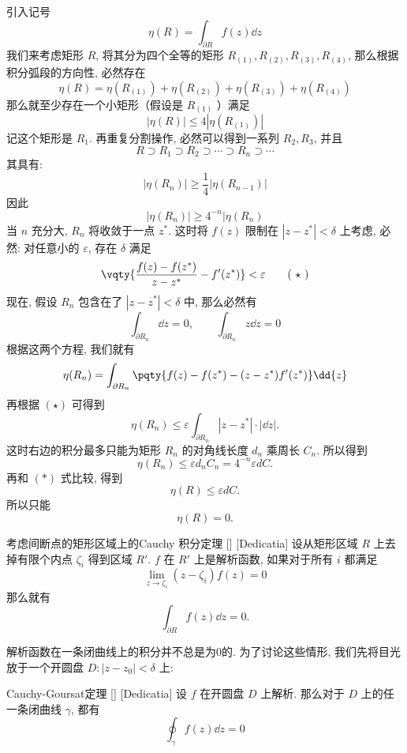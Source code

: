 \documentclass[UTF8]{ctexart}
\begin{document}
        \begin{prf}
            引入记号
            \[\eta(R)=\int_{\partial R}f(z)\dd{z}\]
            我们来考虑矩形 \(R\), 将其分为四个全等的矩形 \(R_{(1)}, R_{(2)}, R_{(3)}, R_{(4)}\), 那么根据积分弧段的方向性, 必然存在
            \[\eta(R)=\eta(R_{(1)})+\eta(R_{(2)})+\eta(R_{(3)})+\eta(R_{(4)})\]
            那么就至少存在一个小矩形（假设是 \(R_{(1)}\) ）满足
            \[|\eta(R)|\leqslant 4|\eta(R_{(1)})|\]
            记这个矩形是 \(R_1\). 再重复分割操作, 必然可以得到一系列 \(R_2, R_3\), 并且
            \[R\supset R_1\supset R_2\supset\cdots\supset R_n\supset\cdots\]
            其具有: 
            \[|\eta(R_n)|\geqslant \frac{1}{4}|\eta(R_{n-1})|\]
            因此
            \[|\eta(R_n)|\geqslant 4^{-n}|\eta(R_n)\tag{ \(\ast\) }\]
            当 \(n\) 充分大,  \(R_n\) 将收敛于一点 \(z^*\). 这时将 \(f(z)\) 限制在 \(|z-z^*|<\delta \) 上考虑, 必然: 对任意小的 \(\varepsilon\), 存在 \(\delta\) 满足
            \[\vqty{\frac{f(z)-f(z^*)}{z-z^*}-f'(z^*)}<\varepsilon\tag{ \(\star\) }\]
            现在, 假设 \(R_n\) 包含在了 \(|z-z^*|<\delta\) 中, 那么必然有
            \[\int_{\partial R_n}\dd{z}=0,\qquad\int_{\partial R_n}z\dd{z}=0\]
            根据这两个方程, 我们就有
            \[\eta(R_n)=\int_{\partial R_n}\pqty{f(z)-f(z^*)-(z-z^*)f'(z^*)}\dd{z}\]
            再根据 \((\star)\) 可得到
            \[\eta(R_n)\leqslant\varepsilon\int_{\partial R_n}|z-z^*|\cdot|\dd z|. \]
            这时右边的积分最多只能为矩形 \(R_n\) 的对角线长度 \(d_n\) 乘周长 \(C_n\). 所以得到
            \[\eta(R_n)\leqslant\varepsilon d_nC_n=4^{-n}\varepsilon dC.\]
            再和 \((\ast)\) 式比较, 得到
            \[\eta(R)\leqslant\varepsilon dC.\]
            所以只能
            \[\eta(R)=0.\]
        \end{prf}

        \begin{thm}
            [UUID]
            {考虑间断点的矩形区域上的Cauchy 积分定理}
            []
            [Dedicatia]
            设从矩形区域 \(R\) 上去掉有限个内点 \(\zeta_i\) 得到区域 \(R'\).  \(f\) 在 \(R'\) 上是解析函数, 如果对于所有 \(i\) 都满足
            \[\lim_{z\to\zeta_i }(z-\zeta_i)f(z)=0\]
            那么就有
            \[\int_{\partial R}f(z)\dd{z}=0.\]
        \end{thm}

        解析函数在一条闭曲线上的积分并不总是为0的. 为了讨论这些情形, 我们先将目光放于一个开圆盘 \(D: |z-z_0|<\delta \) 上:

        \begin{thm}
            [UUID]
            {Cauchy-Goursat定理}
            []
            [Dedicatia]
            设 \(f\) 在开圆盘 \(D\) 上解析. 那么对于 \(D\) 上的任一条闭曲线 \(\gamma\), 都有
            \[\oint_\gamma f(z)\dd{z}=0\]
        \end{thm}
        
\end{document}

